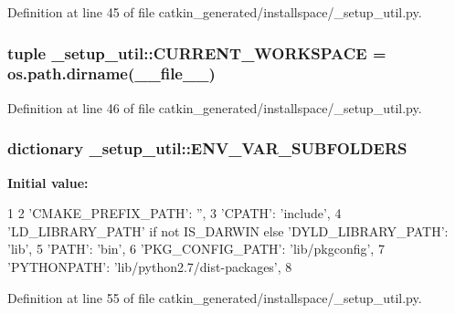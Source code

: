 \-Definition at line 45 of file catkin\-\_\-generated/installspace/\-\_\-setup\-\_\-util.\-py.

\subsubsection[{\-C\-U\-R\-R\-E\-N\-T\-\_\-\-W\-O\-R\-K\-S\-P\-A\-C\-E}]{\setlength{\rightskip}{0pt plus 5cm}tuple {\bf \-\_\-setup\-\_\-util\-::\-C\-U\-R\-R\-E\-N\-T\-\_\-\-W\-O\-R\-K\-S\-P\-A\-C\-E} = os.\-path.\-dirname(\-\_\-\-\_\-file\-\_\-\-\_\-)}\label{namespace__setup__util_adc1d3f8a260ac546e927ab07cc92f266}


\-Definition at line 46 of file catkin\-\_\-generated/installspace/\-\_\-setup\-\_\-util.\-py.

\subsubsection[{\-E\-N\-V\-\_\-\-V\-A\-R\-\_\-\-S\-U\-B\-F\-O\-L\-D\-E\-R\-S}]{\setlength{\rightskip}{0pt plus 5cm}dictionary {\bf \-\_\-setup\-\_\-util\-::\-E\-N\-V\-\_\-\-V\-A\-R\-\_\-\-S\-U\-B\-F\-O\-L\-D\-E\-R\-S}}\label{namespace__setup__util_aa31804f1be8660156ce9394b33c68dc4}
{\bfseries \-Initial value\-:}
\begin{DoxyCode}
1 {
2     'CMAKE_PREFIX_PATH': '',
3     'CPATH': 'include',
4     'LD_LIBRARY_PATH' if not IS_DARWIN else 'DYLD_LIBRARY_PATH': 'lib',
5     'PATH': 'bin',
6     'PKG_CONFIG_PATH': 'lib/pkgconfig',
7     'PYTHONPATH': 'lib/python2.7/dist-packages',
8 }
\end{DoxyCode}


\-Definition at line 55 of file catkin\-\_\-generated/installspace/\-\_\-setup\-\_\-util.\-py.

